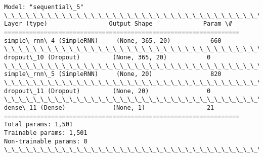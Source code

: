 \documentclass[11pt]{article}
\begin{document}
    \begin{Verbatim}[commandchars=\\\{\}]
Model: "sequential\_5"
\_\_\_\_\_\_\_\_\_\_\_\_\_\_\_\_\_\_\_\_\_\_\_\_\_\_\_\_\_\_\_\_\_\_\_\_\_\_\_\_\_\_\_\_\_\_\_\_\_\_\_\_\_\_\_\_\_\_\_\_\_\_\_\_\_
Layer (type)                 Output Shape              Param \#
=================================================================
simple\_rnn\_4 (SimpleRNN)     (None, 365, 20)           660
\_\_\_\_\_\_\_\_\_\_\_\_\_\_\_\_\_\_\_\_\_\_\_\_\_\_\_\_\_\_\_\_\_\_\_\_\_\_\_\_\_\_\_\_\_\_\_\_\_\_\_\_\_\_\_\_\_\_\_\_\_\_\_\_\_
dropout\_10 (Dropout)         (None, 365, 20)           0
\_\_\_\_\_\_\_\_\_\_\_\_\_\_\_\_\_\_\_\_\_\_\_\_\_\_\_\_\_\_\_\_\_\_\_\_\_\_\_\_\_\_\_\_\_\_\_\_\_\_\_\_\_\_\_\_\_\_\_\_\_\_\_\_\_
simple\_rnn\_5 (SimpleRNN)     (None, 20)                820
\_\_\_\_\_\_\_\_\_\_\_\_\_\_\_\_\_\_\_\_\_\_\_\_\_\_\_\_\_\_\_\_\_\_\_\_\_\_\_\_\_\_\_\_\_\_\_\_\_\_\_\_\_\_\_\_\_\_\_\_\_\_\_\_\_
dropout\_11 (Dropout)         (None, 20)                0
\_\_\_\_\_\_\_\_\_\_\_\_\_\_\_\_\_\_\_\_\_\_\_\_\_\_\_\_\_\_\_\_\_\_\_\_\_\_\_\_\_\_\_\_\_\_\_\_\_\_\_\_\_\_\_\_\_\_\_\_\_\_\_\_\_
dense\_11 (Dense)             (None, 1)                 21
=================================================================
Total params: 1,501
Trainable params: 1,501
Non-trainable params: 0
\_\_\_\_\_\_\_\_\_\_\_\_\_\_\_\_\_\_\_\_\_\_\_\_\_\_\_\_\_\_\_\_\_\_\_\_\_\_\_\_\_\_\_\_\_\_\_\_\_\_\_\_\_\_\_\_\_\_\_\_\_\_\_\_\_
    \end{Verbatim}
\end{document}
